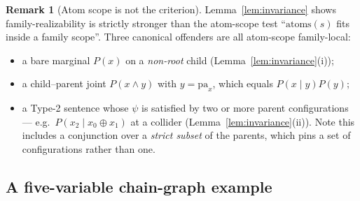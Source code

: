 \documentclass[11pt]{article}
\theoremstyle{definition}
\newtheorem{remark}{Remark}
\newcommand{\pa}{\mathrm{pa}}
\newcommand{\atoms}{\mathrm{atoms}}
\begin{document}
\begin{remark}[Atom scope is not the criterion]\label{rem:scope}
Lemma~\ref{lem:invariance} shows family-realizability is strictly stronger than the atom-scope test
``$\atoms(s)$ fits inside a family scope''. Three canonical offenders are all atom-scope
family-local:
\begin{itemize}\itemsep1pt
  \item a bare marginal $P(x)$ on a \emph{non-root} child (Lemma~\ref{lem:invariance}(i));
  \item a child--parent joint $P(x\wedge y)$ with $y=\pa_x$, which equals $P(x\mid y)P(y)$;
  \item a Type-2 sentence whose $\psi$ is satisfied by two or more parent configurations --- e.g.\
    $P(x_2\mid x_0\oplus x_1)$ at a collider (Lemma~\ref{lem:invariance}(ii)). Note this includes a
    conjunction over a \emph{strict subset} of the parents, which pins a set of configurations rather
    than one.
\end{itemize}
\end{remark}

\subsection{A five-variable chain-graph example}\label{sec:fr5}
\end{document}
